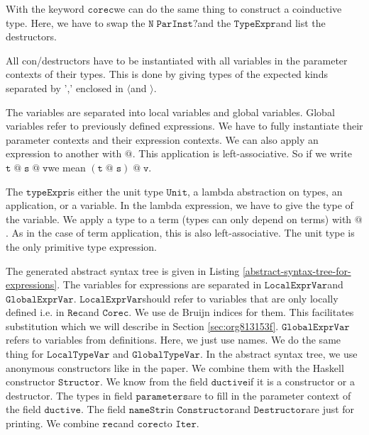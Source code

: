 \documentclass[a4paper,cleardoubleempty,BCOR1cm]{scrbook}
\begin{document}
With the keyword $\mathtt{corec}$\;we can do the same thing to construct a coinductive
type. Here, we have to swap the $\mathtt{N\;ParInst?}$\;and the $\mathtt{TypeExpr}$\;and list the
destructors.

All con/destructors have to be instantiated with all variables in the
parameter contexts of their types. This is done by giving types of the
expected kinds separated by ',' enclosed in $\mathtt{\langle}$\;and $\mathtt{\rangle}$.

The variables are separated into local variables and global variables.
Global variables refer to previously defined expressions. We have to fully
instantiate their parameter contexts and their expression contexts. We can
also apply an expression to another with $\mathtt{@}$. This application is
left-associative. So if we write $\mathtt{t\;@\;s\;@\;v}$\;we mean $\mathtt{(t\;@\;s)\;@\;v}$.

The $\mathtt{typeExpr}$\;is either the unit type $\mathtt{Unit}$, a lambda abstraction on
types, an application, or a variable. In the lambda expression, we have to
give the type of the variable. We apply a type to a term (types can only
depend on terms) with $\mathtt{@}$.  As in the case of term application, this is
also left-associative.  The unit type is the only primitive type
expression.

The generated abstract syntax tree is given in Listing
\ref{abstract-syntax-tree-for-expressions}. The variables for expressions are
separated in $\mathtt{LocalExprVar}$\;and $\mathtt{GlobalExprVar}$. $\mathtt{LocalExprVar}$\;should refer
to variables that are only locally defined i.e. in $\mathtt{Rec}$\;and $\mathtt{Corec}$. We
use de Bruijn indices for them. This facilitates substitution which we will
describe in Section \ref{sec:org813153f}. $\mathtt{GlobalExprVar}$\;refers to variables from
definitions. Here, we just use names. We do the same thing for $\mathtt{LocalTypeVar}$
and $\mathtt{GlobalTypeVar}$. In the abstract syntax tree, we use anonymous
constructors like in the paper. We combine them with the Haskell constructor
$\mathtt{Structor}$. We know from the field $\mathtt{ductive}$\;if it is a constructor or a
destructor. The types in field $\mathtt{parameters}$\;are to fill in the parameter
context of the field $\mathtt{ductive}$. The field $\mathtt{nameStr}$\;in $\mathtt{Constructor}$\;and
$\mathtt{Destructor}$\;are just for printing. We combine $\mathtt{rec}$\;and $\mathtt{corec}$\;to $\mathtt{Iter}$.
\end{document}
